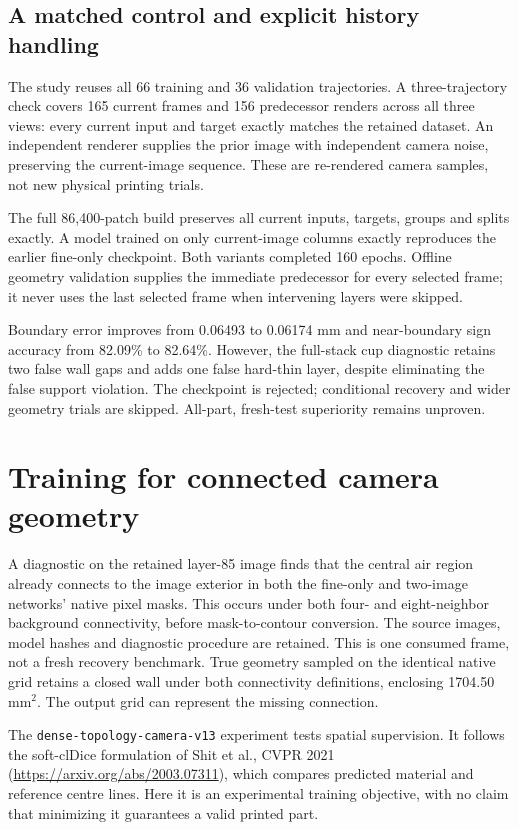 \documentclass[10pt,letterpaper]{article}
\begin{document}
\subsection*{A matched control and explicit history handling}
The study reuses all 66 training and 36 validation trajectories. A three-trajectory
check covers 165 current frames and 156 predecessor renders across all three
views: every current input and target exactly matches the retained dataset.
An independent renderer supplies the prior image with independent camera noise,
preserving the current-image sequence. These are re-rendered camera samples,
not new physical printing trials.

The full 86,400-patch build preserves all current inputs, targets, groups and
splits exactly. A model trained on only current-image columns exactly reproduces
the earlier fine-only checkpoint. Both variants completed 160 epochs. Offline geometry
validation supplies the immediate predecessor for every selected frame; it never
uses the last selected frame when intervening layers were skipped.

Boundary error improves from 0.06493 to 0.06174 mm and near-boundary sign accuracy
from 82.09\% to 82.64\%. However, the full-stack cup diagnostic retains two false
wall gaps and adds one false hard-thin layer, despite eliminating the false
support violation. The checkpoint is rejected; conditional recovery and wider
geometry trials are skipped. All-part, fresh-test superiority remains unproven.

\clearpage
\section{Training for connected camera geometry}

A diagnostic on the retained layer-85 image finds that the central air region
already connects to the image exterior in both the fine-only and two-image
networks' native pixel masks. This occurs under both four- and eight-neighbor
background connectivity, before mask-to-contour conversion. The source images,
model hashes and diagnostic procedure are retained. This is one consumed frame,
not a fresh recovery benchmark. True geometry sampled on the identical native
grid retains a closed wall under both connectivity definitions, enclosing
1704.50 mm$^2$. The output grid can represent the missing connection.

The \texttt{dense-topology-camera-v13} experiment tests spatial supervision.
It follows the soft-clDice formulation of Shit et al., CVPR 2021
(\url{https://arxiv.org/abs/2003.07311}), which compares predicted material and
reference centre lines. Here it is an experimental training objective, with no
claim that minimizing it guarantees a valid printed part.
\end{document}
